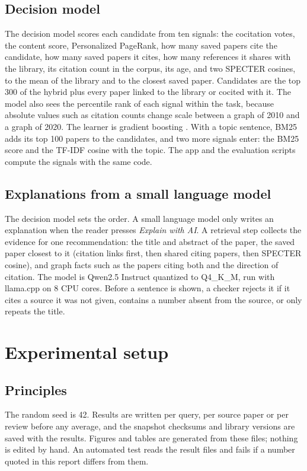 \documentclass[11pt,a4paper]{article}
\begin{document}
\subsection{Decision model}\label{sec:decisionmethod}
The decision model scores each candidate from ten signals: the cocitation votes, the content score, Personalized PageRank, how many saved papers cite the candidate, how many saved papers it cites, how many references it shares with the library, its citation count in the corpus, its age, and two SPECTER cosines, to the mean of the library and to the closest saved paper. Candidates are the top 300 of the hybrid plus every paper linked to the library or cocited with it. The model also sees the percentile rank of each signal within the task, because absolute values such as citation counts change scale between a graph of 2010 and a graph of 2020. The learner is gradient boosting \citep{friedman2001}. With a topic sentence, BM25 adds its top 100 papers to the candidates, and two more signals enter: the BM25 score and the TF-IDF cosine with the topic. The app and the evaluation scripts compute the signals with the same code.

\subsection{Explanations from a small language model}\label{sec:slmmethod}
The decision model sets the order. A small language model only writes an explanation when the reader presses \emph{Explain with AI}. A retrieval step collects the evidence for one recommendation: the title and abstract of the paper, the saved paper closest to it (citation links first, then shared citing papers, then SPECTER cosine), and graph facts such as the papers citing both and the direction of citation. The model is Qwen2.5 Instruct quantized to Q4\_K\_M, run with llama.cpp on 8 CPU cores. Before a sentence is shown, a checker rejects it if it cites a source it was not given, contains a number absent from the source, or only repeats the title.

\section{Experimental setup}\label{sec:setup}
\subsection{Principles}
The random seed is 42. Results are written per query, per source paper or per review before any average, and the snapshot checksums and library versions are saved with the results. Figures and tables are generated from these files; nothing is edited by hand. An automated test reads the result files and fails if a number quoted in this report differs from them.
\end{document}

